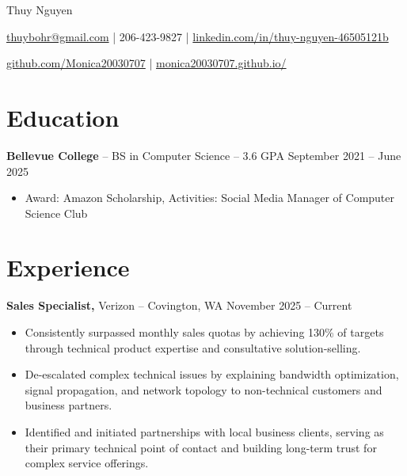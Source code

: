 \documentclass[11pt]{article}       %
\begin{document}
\centerline{\Huge Thuy Nguyen}

\vspace{5pt}

\centerline{\href{mailto:thuybohr@gmail.com}{thuybohr@gmail.com} | 206-423-9827 |
\href{https://www.linkedin.com/in/thuy-nguyen-46505121b/}{linkedin.com/in/thuy-nguyen-46505121b}}

\centerline{\href{https://github.com/Monica20030707}{github.com/Monica20030707} | 
\href{https://monica20030707.github.io/}{monica20030707.github.io/}} 

\vspace{-9pt}

\section*{Education}
\textbf{Bellevue College} -- BS in Computer Science -- 3.6 GPA \hfill September 2021 -- June 2025\\
\vspace{-9pt}
\begin{itemize}
  \item Award: Amazon Scholarship, Activities: Social Media Manager of Computer Science Club
\end{itemize}

\vspace{-18.5pt}

\section*{Experience}

\textbf{Sales Specialist,} {Verizon} -- Covington, WA \hfill November 2025 -- Current \\
\vspace{-9pt}
\begin{itemize}
  \item Consistently surpassed monthly sales quotas by achieving 130\% of targets through technical product expertise and consultative solution-selling.
  \item De-escalated complex technical issues by explaining bandwidth optimization, signal propagation, and network topology to non-technical customers and business partners.
  \item Identified and initiated partnerships with local business clients, serving as their primary technical point of contact and building long-term trust for complex service offerings.
\end{itemize}
\end{document}
